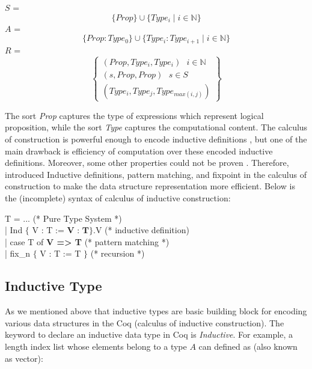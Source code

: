 \begin{displayquote}

    $S$ = \[ \lbrace  Prop \rbrace \cup \lbrace  Type_{i} \mid  i \in \mathbb{N} \rbrace \]
    $A$ =  \[ \lbrace Prop : Type_{0} \rbrace \cup \lbrace Type_{i} : Type_{i+1} \mid i \in \mathbb{N} \rbrace \]
    $R$ = 
     \[
   \left\{ \begin{array}{l}
   (Prop, Type_{i}, Type_{i}) \text{      } i \in \mathbb{N}  \\
   (s, Prop, Prop)  \text{     } s \in S \\
   (Type_{i}, Type_{j}, Type_{max (i, j)}) 
  \end{array}\right\}
\]
       
\end{displayquote}

\noindent
The sort \textit{Prop} captures the type of expressions which represent logical proposition, while 
the sort \textit{Type} captures the computational content.   The calculus of construction is
 powerful enough to encode inductive definitions \citep{pfenning1989inductively}, but 
 one of the main drawback is efficiency of computation over these encoded 
 inductive definitions.  Moreover, some other properties could not be proven \citep{10.1007/3-540-45413-6_16}.
Therefore, \citep{Paulin-Mohring:1993:IDS:645891.671440}  introduced 
Inductive definitions, pattern matching, and fixpoint in the calculus of construction to make the data structure 
representation more efficient.  Below is the  (incomplete) syntax of calculus of inductive construction:

 \begin{displayquote}

    T = ...  (*  Pure Type System *) \\
       | Ind $\lbrace$ V : T :=  $\textbf{V : T} \rbrace$.V (* inductive definition) \\
       | case T of \textbf{V => T} (* pattern matching *)  \\
       | fix_{n}  $\lbrace$ V : T := T $\rbrace$ (* recursion *) \\
   \end{displayquote}
 

 
\subsection{Inductive Type}
As we mentioned above that inductive types are basic building block for encoding various 
data structures in the Coq (calculus of inductive construction). The keyword to declare an inductive data type in Coq is 
\textit{Inductive}. For example, a length index list
whose elements belong to a type $A$ can defined as (also known as vector):

